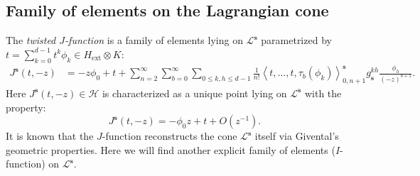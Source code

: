 \documentclass[11pt]{amsart}
\theoremstyle{definition} %
\theoremstyle{remark} %
\def\corr#1{\left\langle #1 \right\rangle}
\newcommand{\bs}{\mathbf{s}}
\newcommand{\cL}{\mathcal{L}}
\newcommand{\cH}{\mathcal{H}}
\newcommand{\ext}{{\operatorname{ext}}}
\begin{document}
\subsection{Family of elements on the Lagrangian cone}
\label{subsec:familyofelements} 
The \emph{twisted $J$-function} is a family of elements 
lying on $\cL^\bs$ parametrized by 
$t=\sum_{k=0}^{d-1} t^k \phi_k\in H_\ext \otimes K$: 
\begin{align}
\label{eq:twisted-J-funct} 
J^{\bs}(t,-z) & 
= -z \phi_0 + t + \sum_{n=2}^\infty 
\sum_{b=0}^\infty \sum_{0\le k,h\le d-1} 
\frac{1}{n!} 
\corr{ t,\dots, t, \tau_b(\phi_k)}
_{0,n+1}^{\bs} g^{kh}_{\bs} \frac{\phi_h}{(-z)^{b+1}}. 
\end{align}
Here $J^\bs(t,-z)\in \cH$ is characterized as 
a unique point lying on $\cL^\bs$ with the property: 
\begin{equation}
\label{eq:charactJ}
J^{\bs}(t,-z)=-\phi_0 z+t+O(z^{-1}). 
\end{equation} 
It is known \cite{Givental} that the 
$J$-function reconstructs 
the cone $\cL^\bs$ itself via 
Givental's geometric properties. 
Here we will find another explicit 
family of elements ($I$-function) on $\cL^{\bs}$. 
\end{document}
